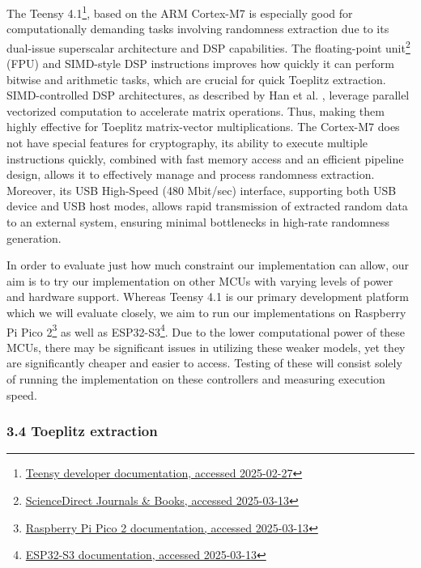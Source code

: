 The Teensy 4.1\footnote{\href{https://www.pjrc.com/store/teensy41.html}{Teensy developer documentation, accessed 2025-02-27}}, based on the ARM Cortex-M7 is especially good for computationally demanding tasks involving randomness extraction due to its dual-issue superscalar architecture and DSP capabilities. The floating-point unit\footnote{\href{https://www.sciencedirect.com/topics/computer-science/floating-point-unit}{ScienceDirect Journals \& Books, accessed 2025-03-13}} (FPU) and SIMD-style DSP instructions improves how quickly it can perform bitwise and arithmetic tasks, which are crucial for quick Toeplitz extraction. SIMD-controlled DSP architectures, as described by Han et al. \cite{simd-dsp}, leverage parallel vectorized computation to accelerate matrix operations. Thus, making them highly effective for Toeplitz matrix-vector multiplications. The Cortex-M7 does not have special features for cryptography, its ability to execute multiple instructions quickly, combined with fast memory access and an efficient pipeline design, allows it to effectively manage and process randomness extraction. Moreover, its USB High-Speed (480 Mbit/sec) interface, supporting both USB device and USB host modes, allows rapid transmission of extracted random data to an external system, ensuring minimal bottlenecks in high-rate randomness generation.

In order to evaluate just how much constraint our implementation can allow, our aim is to try our implementation on other MCUs with varying levels of power and hardware support. Whereas Teensy 4.1 is our primary development platform which we will evaluate closely, we aim to run our implementations on Raspberry Pi Pico 2\footnote{\href{https://datasheets.raspberrypi.com/pico/pico-2-product-brief.pdf}{Raspberry Pi Pico 2 documentation, accessed 2025-03-13}} as well as ESP32-S3\footnote{\href{https://www.espressif.com/sites/default/files/documentation/esp32-s3_datasheet_en.pdf}{ESP32-S3 documentation, accessed 2025-03-13}}. Due to the lower computational power of these MCUs, there may be significant issues in utilizing these weaker models, yet they are significantly cheaper and easier to access. Testing of these will consist solely of running the implementation on these controllers and measuring execution speed.

\subsubsection{\texorpdfstring{3.4 Toeplitz extraction }{3.4 Toeplitz extraction }}\label{toeplitz-extraction}


